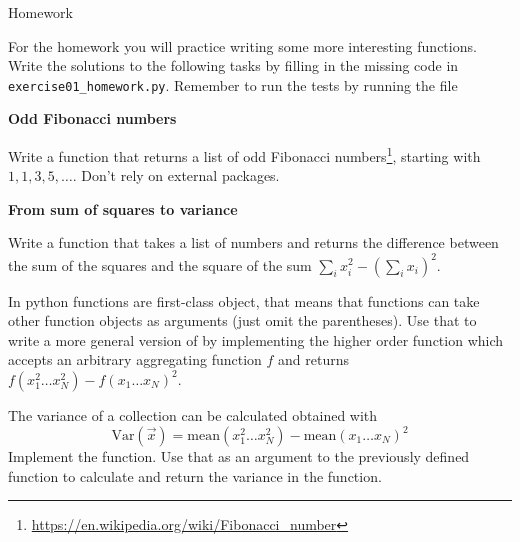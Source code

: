 \documentclass[a4paper, draft=False]{scrartcl}
\begin{document}
    \newpage
    \begin{exam}[Homework]{Homework}

      \begin{instructions}

        For the homework you will practice writing some more interesting functions.
        Write the solutions to the following tasks by filling in the missing code in
        \texttt{exercise01\_homework.py}. Remember to run the tests by running the file
      \end{instructions}

      \begin{problem}[4]\textbf{Odd Fibonacci numbers}

        Write a function  that returns a
        list of  odd Fibonacci
        numbers\footnote{\url{https://en.wikipedia.org/wiki/Fibonacci_number}},
        starting with $1, 1, 3, 5, \ldots$. Don't rely on external packages.
      \end{problem}
      \begin{problem*}[\auto]\textbf{From sum of squares to variance}

        \begin{parts}
        \item{} Write a function  that takes a list
          of numbers and returns the difference between the sum of the squares and
          the square of the sum $\sum_i x_i^2 - \left(\sum_i x_i\right)^2$.
        \item{} In python functions are first-class object, that means
          that functions can take other function objects as arguments (just omit
          the parentheses). Use that to write a more general version of
           by implementing the higher order function
           which accepts an arbitrary aggregating
          function $f$ and returns $f(x_1^2\ldots x_N^2) - f(x_1\ldots x_N)^2$.
        \item{} The variance of a collection can be calculated obtained with
          \begin{equation*}
            \mathrm{Var}(\vec{x}) = \mathrm{mean}(x_1^2\ldots x_N^2) - \mathrm{mean}(x_1\ldots x_N)^2
          \end{equation*}
          Implement the  function. Use that as an argument to the previously defined
           function to calculate and return the variance
          in the  function.
        \end{parts}
      \end{problem*}
    \end{exam}

  
\end{document}
